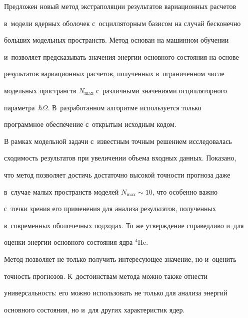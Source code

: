   Предложен новый метод экстраполяции результатов вариационных расчетов 


  в~модели ядерных оболочек с~осцилляторным базисом на случай бесконечно 


больших модельных пространств. Метод основан на машинном обуче\-нии 


и~поз\-во\-ля\-ет пред\-ска\-зы\-вать значения энергии основного со\-сто\-яния на основе 


результатов вариационных расчетов, полученных в~ограниченном чис\-ле 


модельных пространств $N_{\max}$ с~различными значениями осцилляторного 


па\-ра\-мет\-ра~$\hbar\Omega$. В~разработанном алгоритме используется только 


программное обеспечение с~открытым исходным кодом.


  


  В рамках модельной задачи с~известным точ\-ным решением исследовалась 


схо\-ди\-мость результатов при увеличении объема входных данных. Показано, 


что метод поз\-во\-ля\-ет до\-стичь достаточно высокой точ\-ности прогноза даже 


в~случае малых пространств моделей $N_{\max}\sim 10$, что особенно важ\-но 


с~точ\-ки зрения его применения для анализа результатов, полученных 


в~современных оболочечных подходах. То же утверж\-де\-ние справедливо и~для 


оцен\-ки энергии основного со\-сто\-яния ядра ${}^4$He.


  


  Метод позволяет не только получить ин\-те\-ре\-су\-ющее значение, но и~оценить 


точ\-ность прогнозов. К~достоинствам метода мож\-но так\-же отнести 


уни\-вер\-саль\-ность: его можно использовать не только для анализа энергий 


основного со\-сто\-яния, но и~для других характеристик ядер.





